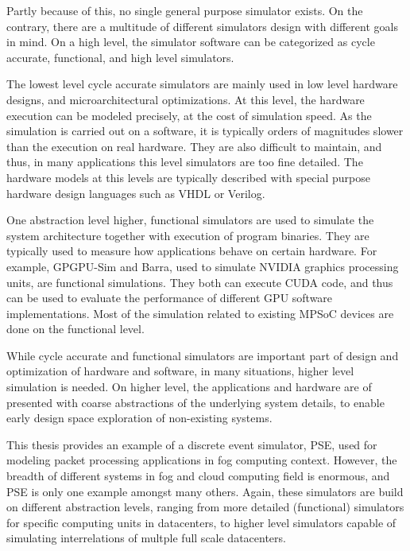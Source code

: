 Partly because of this, no single general purpose simulator exists. On the contrary, there are a multitude of different simulators design with different goals in mind. On a high level, the simulator software can be categorized as cycle accurate, functional, and high level simulators.

The lowest level cycle accurate simulators are mainly used in low level hardware designs, and microarchitectural optimizations. At this level, the hardware execution can be modeled precisely, at the cost of simulation speed. As the simulation is carried out on a software, it is typically orders of magnitudes slower than the execution on real hardware. They are also difficult to maintain, and thus, in many applications this level simulators are too fine detailed. The hardware models at this levels are typically described with special purpose hardware design languages such as VHDL or Verilog.~\cite{Patterson:2007:Computer, Weaver:2008:Cycle}

One abstraction level higher, functional simulators are used to simulate the system architecture together with execution of program binaries. They are typically used to measure how applications behave on certain hardware. For example, GPGPU-Sim and Barra, used to simulate NVIDIA graphics processing units, are functional simulations. They both can execute CUDA code, and thus can be used to evaluate the performance of different GPU software implementations. Most of the simulation related to existing MPSoC devices are done on the functional level.~\cite{Lopez:2015:GPGPUSIM}

While cycle accurate and functional simulators are important part of design and optimization of hardware and software, in many situations, higher level simulation is needed. On higher level, the applications and hardware are of presented with coarse abstractions of the underlying system details, to enable early design space exploration of non-existing systems.

This thesis provides an example of a discrete event simulator, PSE, used for modeling packet processing applications in fog computing context. However, the breadth of different systems in fog and cloud computing field is enormous, and PSE is only one example amongst many others. Again, these simulators are build on different abstraction levels, ranging from more detailed (functional) simulators for specific computing units in datacenters, to higher level simulators capable of simulating interrelations of multple full scale datacenters.


